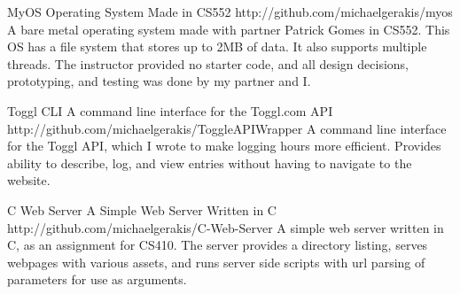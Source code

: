 


\begin{cvprojects}


\cvproject
{MyOS} %
{Operating System Made in CS552} %
{http://github.com/michaelgerakis/myos} %
{A bare metal operating system made with partner Patrick Gomes in CS552. This OS has a file system that stores up to 2MB of data. It also supports multiple threads. The instructor provided no starter code, and all design decisions, prototyping, and testing was done by my partner and I.} %


\cvproject
{Toggl CLI} %
{A command line interface for the Toggl.com API} %
{http://github.com/michaelgerakis/ToggleAPIWrapper} %
{A command line interface for the Toggl API, which I wrote to make logging hours more efficient. Provides ability to describe, log, and view entries without having to navigate to the website.} %


\cvproject
{C Web Server} %
{A Simple Web Server Written in C} %
{http://github.com/michaelgerakis/C-Web-Server} %
{A simple web server written in C, as an assignment for CS410. The server provides a directory listing, serves webpages with various assets, and runs server side scripts with url parsing of parameters for use as arguments.} %


\end{cvprojects}
